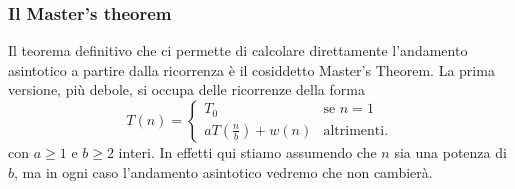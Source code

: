 \documentclass[11pt]{scrartcl}
\begin{document}
	\subsubsection{Il Master's theorem}
	
	Il teorema definitivo che ci permette di calcolare direttamente l'andamento asintotico a partire dalla ricorrenza è il cosiddetto Master's Theorem. La prima versione, più debole, si occupa delle ricorrenze della forma
	$$T(n)=
	\begin{cases}
		T_0 & \text{se $n=1$} \\
		a T\left(\frac{n}{b}\right)+w(n) & \text{altrimenti.}
	\end{cases}
	$$
	con $a \ge 1$ e $b\ge 2$ interi. In effetti qui stiamo assumendo che $n$ sia una potenza di $b$, ma in ogni caso l'andamento asintotico vedremo che non cambierà.
	
\end{document}
